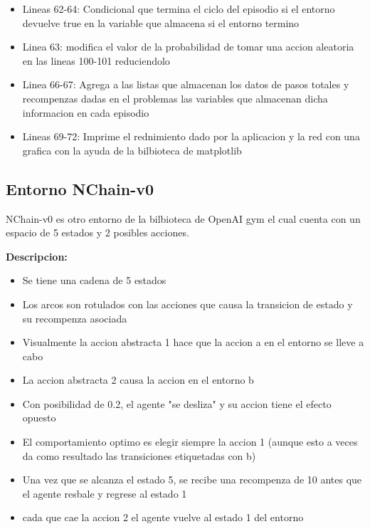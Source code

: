 \begin{itemize}
	\item Lineas 62-64: Condicional que termina el ciclo del episodio si el entorno devuelve true en la variable que almacena si el entorno termino
	\item Linea 63: modifica el valor de la probabilidad de tomar una accion aleatoria en las lineas 100-101 reduciendolo
	\item Linea 66-67: Agrega a las listas que almacenan los datos de pasos totales y recompenzas dadas en el problemas las variables que almacenan dicha informacion en cada episodio
	\item Lineas 69-72: Imprime el rednimiento dado por la aplicacion y la red con una grafica con la ayuda de la bilbioteca de matplotlib
\end{itemize}

\subsection{Entorno NChain-v0}

NChain-v0 es otro entorno de la bilbioteca de OpenAI gym el cual cuenta con un espacio de 5 estados y 2 posibles acciones.

\textbf{Descripcion:}

\begin{itemize}
    \item Se tiene una cadena de 5 estados
    
    \item Los arcos son rotulados con las acciones que causa la transicion de estado y su recompenza asociada
    
    \item Visualmente la accion abstracta 1 hace que la accion a en el entorno se lleve a cabo
    
    \item La accion abstracta 2 causa la accion en el entorno b
    
    \item Con posibilidad de 0.2, el agente "se desliza" y su accion tiene el efecto opuesto
    
    \item El comportamiento optimo es elegir siempre la accion 1 (aunque esto a veces da como resultado las transiciones etiquetadas con b)
    
    \item Una vez que se alcanza el estado 5, se recibe una recompenza de 10 antes que el agente resbale y regrese al estado 1
    
    \item cada que cae la accion 2 el agente vuelve al estado 1 del entorno
    
\end{itemize}


